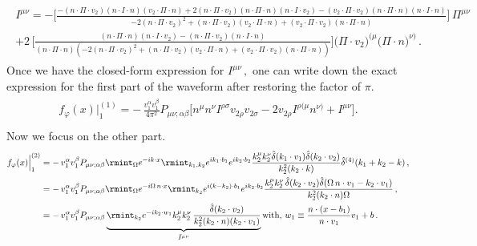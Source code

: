 \begin{align}
\begin{split} 
\hspace{0cm}\label{IMUNU}I^{\mu\nu} =-\Big[\frac{-(n\cdot \Pi\cdot v_2) (n\cdot I\cdot n) (v_2\cdot \Pi\cdot n)+2(n\cdot \Pi\cdot v_2)(n\cdot \Pi\cdot n) (n\cdot I\cdot v_2)-(v_2\cdot \Pi\cdot v_2) (n\cdot \Pi\cdot n)(n\cdot I \cdot n)}{-2 (n\cdot \Pi\cdot v_2)^2+(n\cdot \Pi\cdot v_2) (v_2\cdot \Pi\cdot n)+(v_2\cdot \Pi\cdot v_2) (n\cdot \Pi\cdot n)}\Big]\,\Pi^{\mu\nu} \\
+ 2\,\Big[\frac{(n\cdot \Pi\cdot n) (n\cdot I\cdot v_2)-(n\cdot \Pi\cdot v_2) (n\cdot I\cdot n)}{(n \cdot \Pi\cdot n) \left(-2 (n\cdot \Pi\cdot v_2)^2+(n\cdot \Pi\cdot v_2) (v_2\cdot \Pi\cdot n)+(v_2\cdot \Pi\cdot v_2) (n\cdot \Pi\cdot n)\right)}\Big]\Big(\Pi \cdot v_{2}\Big)^{(\mu}\Big(\Pi\cdot n\Big)^{\nu)}\,.
\end{split}
\end{align}
Once we have the closed-form expression for $I^{\mu\nu}\,,$ one can write down the exact expression for the first part of the waveform after restoring the factor of $\pi$.
\begin{align}\begin{split}\label{e:}
f_{\varphi}(x)\Big|_{1}^{(1)}=-\,\frac{v_1^\alpha v_1^\beta}{4\pi^2}P_{\mu\nu;\alpha\beta}\Big[n^{\mu}n^\nu I^{\rho\sigma}v_{2\rho}v_{2\sigma}-2v_{2\rho}I^{\rho(\mu}n^{\nu)}+I^{\mu\nu}\Big].\\
\end{split}
\end{align}
Now we focus on the other part.
\begin{align}
    \begin{split}
        f_{\varphi}(x)\Big|_{1}^{(2)}&=-\,v_1^\alpha v_1^\beta P_{\mu\nu;\alpha\beta}\rmint_{\Omega}e^{-ik\cdot x}\rmint_{k_1,k_2}e^{ik_1\cdot b_1}e^{ik_2\cdot b_2}\frac{k_2^\mu k_2^\nu \hat\delta(k_1\cdot v_1)\hat\delta(k_2\cdot v_2)}{k_2^2 (k_2\cdot k)}\hat\delta^{(4)}(k_1+k_2-k)\,,\\ &
        =-\,v_1^\alpha v_1^\beta P_{\mu\nu;\alpha\beta}\rmint_{\Omega}e^{-i \Omega \,n \cdot x}\rmint_{k_2}e^{i (k-k_2)\cdot b_1} e^{ik_2\cdot b_2} \frac{k_2^\mu k_2^\nu \,\hat\delta(k_2\cdot v_2)\hat\delta(\Omega\,n\cdot v_1-k_2\cdot v_1)}{k_2^2 (k_2\cdot n)\Omega}\,,\\ &
        =-\,v_1^\alpha v_1^\beta P_{\mu\nu;\alpha\beta} \underbrace{\rmint_{k_2} e^{-i k_2 \cdot w_1}k_2^\mu k_2^\nu\, \frac{\hat\delta(k_2\cdot v_2)}{k_2^2(k_2\cdot n)(k_2\cdot v_1)}}_{\bar{I}^{\mu\nu}} \textrm{with},\,w_1\equiv \frac{n\cdot (x-b_1)}{n\cdot v_1}v_1+b\,.\label{5.43mm}
    \end{split}
\end{align}
